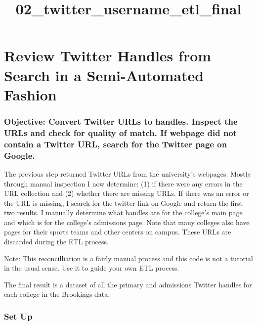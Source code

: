 \documentclass[11pt]{article}
\title{02\_twitter\_username\_etl\_final}
\begin{document}
    
    
    \maketitle
    
    

    
    \hypertarget{review-twitter-handles-from-search-in-a-semi-automated-fashion}{%
\section{Review Twitter Handles from Search in a Semi-Automated
Fashion}\label{review-twitter-handles-from-search-in-a-semi-automated-fashion}}

    \hypertarget{objective-convert-twitter-urls-to-handles.-inspect-the-urls-and-check-for-quality-of-match.-if-webpage-did-not-contain-a-twitter-url-search-for-the-twitter-page-on-google.}{%
\subsubsection{Objective: Convert Twitter URLs to handles. Inspect the
URLs and check for quality of match. If webpage did not contain a
Twitter URL, search for the Twitter page on
Google.}\label{objective-convert-twitter-urls-to-handles.-inspect-the-urls-and-check-for-quality-of-match.-if-webpage-did-not-contain-a-twitter-url-search-for-the-twitter-page-on-google.}}

    The previous step returned Twitter URLs from the university's webpages.
Mostly through manual inspection I now determine: (1) if there were any
errors in the URL collection and (2) whether there are missing URLs. If
there was an error or the URL is missing, I search for the twitter link
on Google and return the first two results. I manually determine what
handles are for the college's main page and which is for the college's
admissions page. Note that many colleges also have pages for their
sports teams and other centers on campus. These URLs are discarded
during the ETL process.

Note: This reconcilliation is a fairly manual process and this code is
not a tutorial in the usual sense. Use it to guide your own ETL process.

The final result is a dataset of all the primary and admissions Twitter
handles for each college in the Brookings data.

    \hypertarget{set-up}{%
\subsubsection{Set Up}\label{set-up}}
\end{document}
